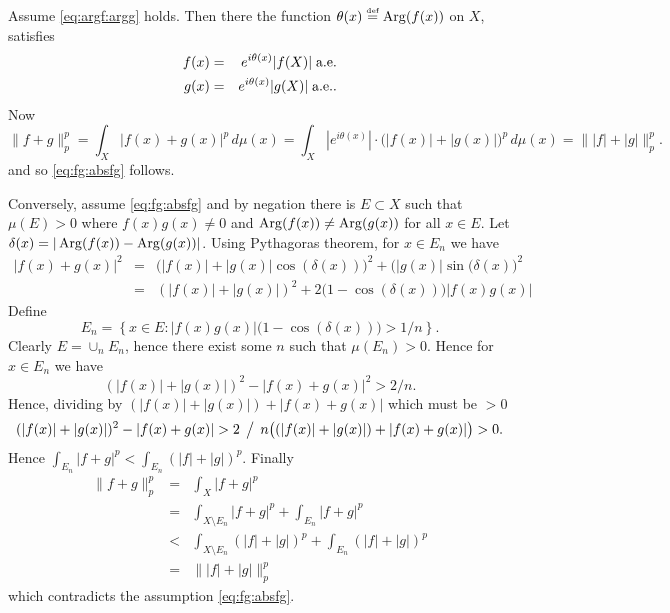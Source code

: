 \begin{thmproof}
Assume \eqref{eq:argf:argg} holds.
Then there the function \(\theta(x) \stackrel{\mbox{\upshape\tiny def}}{=} \mathop{\rm Arg}\nolimits(f(x))\)
on $X$, satisfies
\begin{eqnarray*}
f(x) &=& e^{i\theta(x)}|f(X)| \;\textrm{a.e.} \\
g(x) &=& e^{i\theta(x)}|g(X)| \;\textrm{a.e.}.
\end{eqnarray*}
Now
\[
\|f+g\|_p^p
= \int_X |f(x)+g(x)|^p\,d\mu(x)
= \int_X |e^{i\theta(x)}|\cdot\bigl(|f(x)|+|g(x)|\bigr)^p\,d\mu(x)
= \||f|+|g|\|_p^p.
\]
and so \eqref{eq:fg:absfg} follows.

Conversely, assume \eqref{eq:fg:absfg} and by negation
there is \(E\subset X\) such that \(\mu(E) > 0\) where
\(f(x)g(x)\neq 0\) and
\(\mathop{\rm Arg}\nolimits(f(x)) \neq  \mathop{\rm Arg}\nolimits(g(x))\) for all \(x\in E\).
Let \(\delta(x) = |\mathop{\rm Arg}\nolimits(f(x)) - \mathop{\rm Arg}\nolimits(g(x))|\).
Using Pythagoras theorem, for \(x\in E_n\) we have
\begin{eqnarray*}
|f(x) + g(x)|^2
&=&   \bigl(|f(x)| + |g(x)|\cos(\delta(x))\bigr)^2
  + \bigl(|g(x)|\sin(\delta(x)\bigr)^2 \\
&=& (|f(x)| + |g(x)|)^2 + 2\bigl(1-\cos(\delta(x))\bigr)|f(x)g(x)|
\end{eqnarray*}
Define
\[
E_n = \left\{x\in E: |f(x)g(x)|\bigl(1-\cos(\delta(x))\bigr) > 1/n\right\}.
\]
Clearly \(E=\cup_n E_n\), hence there exist some $n$ such that \(\mu(E_n) > 0\).
Hence for \(x\in E_n\) we have
\[
(|f(x)| + |g(x)|)^2 - |f(x) + g(x)|^2  > 2/n.
\]
Hence, dividing by \((|f(x)| + |g(x)|) + |f(x) + g(x)|\) which must be \(>0\)
\[
(|f(x)| + |g(x)|)^2 - |f(x) + g(x)|
  > 2\,\bigm/\,n\bigl((|f(x)| + |g(x)|) + |f(x) + g(x)|\bigr) > 0.
\]
Hence \(\int_{E_n} |f+g|^p < \int_{E_n} (|f|+|g|)^p\).
Finally
\begin{eqnarray*}
\|f+g\|_p^p
&=& \int_X |f+g|^p \\
&=& \int_{X\setminus E_n} |f+g|^p     + \int_{E_n} |f+g|^p \\
&<& \int_{X\setminus E_n} (|f|+|g|)^p + \int_{E_n} (|f|+|g|)^p \\
&=& \| |f| + |g| \|_p^p
\end{eqnarray*}
which contradicts the assumption \eqref{eq:fg:absfg}.
\end{thmproof}


